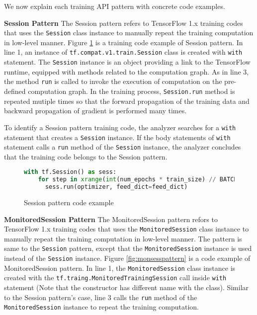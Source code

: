 We now explain each training API pattern with concrete code examples.

\textbf{Session Pattern} 
The Session pattern refers to TensorFlow 1.x training codes that
uses the {\tt Session} class instance to manually repeat the training 
computation in low-level manner.
Figure \ref{fig:sessionpattern} is a training code example of 
Session pattern.
In line 1, an instance of {\tt tf.compat.v1.train.Session} class is 
created with {\tt with} statement.
The {\tt Session} instance is an object providing a link to 
the TensorFlow runtime, equipped with methods related to the computation graph.
As in line 3, the method {\tt run} is called to invoke the
execution of computation on the pre-defined computation graph.
In the training process, {\tt Session.run} method is repeated mutiple times
so that the forward propagation of the training data and
backward propagation of gradient is performed many times.

To identify a Session pattern training code,
the analyzer searches for a {\tt with} statement that creates a
{\tt Session} instance.
If the body statements of {\tt with} statement calls a 
{\tt run} method of the {\tt Session} instance,
the analyzer concludes that the training code belongs to the Session pattern.

\begin{figure}[!ht]
\begin{lstlisting}[language=Python]
with tf.Session() as sess:
    for step in xrange(int(num_epochs * train_size) // BATCH_SIZE):
      sess.run(optimizer, feed_dict=feed_dict)
\end{lstlisting}
\caption{Session pattern code example}
\label{fig:sessionpattern}
\end{figure}

\textbf{MonitoredSession Pattern}
The MonitoredSession pattern refors to TensorFlow 1.x training codes that
uses the {\tt MonitoredSession} class instance to manually repeat
the training computation in low-level manner.
The pattern is same to the {\tt Session} pattern, except that the
{\tt MonitoredSession} instance is used instead of the {\tt Session} instance.
Figure \ref{fig:monsesspattern} is a code example of MonitoredSession pattern.
In line 1, the {\tt MonitoredSession} class instance is created with
the {\tt tf.traing.MonitoredTrainingSession} call inside {\tt with} statement
(Note that the constructor has different name with the class).
Similar to the Session pattern's case, line 3 calls the {\tt run} method of the
{\tt MonitoredSession} instance to repeat the training computation.

